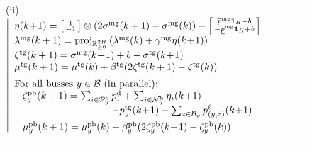 \documentclass{IEEEtran}  %
\newcommand{\mc}{\mathcal}
\newcommand{\bb}{\mathbb}
\newcommand{\R}{\bb R}
\newcommand{\proj}{\mathrm{proj}}
\newcommand{\0}{\mathbf{0}}
\newcommand{\1}{\mathbf{1}}
\begin{document}
\begin{figure}
{\begin{minipage}{\columnwidth}
\medskip
\noindent
\noindent 
(ii) \\[.2em]
\hspace*{.15em}
$
\left| 
\begin{array}{l}
%
\eta(k\!+\!1) = 
	\left[
	\begin{smallmatrix}
	1\\
	- 1 
	\end{smallmatrix}
	\right] \otimes (2 \sigma^{\text{mg}}(k+1)- \sigma^{\text{mg}}(k)) 
	-
	\left[
	\begin{smallmatrix}
	\overline{p}^{\mathrm{mg}}\1_{H}-b \\
	-     \underline{p}^{\mathrm{mg}} \1_{H}+b
	\end{smallmatrix} 
	\right]\\
	\lambda^{\text{mg}}(k+1) = \textstyle
	\proj_{\R^{2 H}_{\geq 0}}\left( 
	\lambda^{\text{mg}}(k) + \gamma^{\text{mg}} \eta(k\!+\!1)
	 \right)\\
%
\zeta^{\text{tg}}(k+1) = \sigma^{\text{mg}}
	(k\!+\!1)+b- \sigma^{\text{tg}}(k\!+\!1)\\
	\mu^{\text{tg}}(k+1) = \mu^{\text{tg}}(k) + \beta^{\text{tg}} (2\zeta^{\text{tg}}(k+1)-\zeta^{\text{tg}}(k))\\[.5em]
\text{For all busses } y \in \mc B \text{ (in parallel):}\\
\left|
\begin{array}{l}
\zeta^{\text{pb}}_y(k+1)   = \sum_{i \in \mc P_y^{\mathrm{b}}} p_i^{\mathrm{d}} + \sum_{i \in \mc N_y^{\mathrm{b}}} \eta_i(k\!+\!1)\\
\hspace*{9em} - p^{\text{tg}}_y(k\!+\!1) - \sum_{z \in \mc B_y} p^\ell_{(y,z)} (k\!+\!1)\\[.5em]
%
\mu_y^{\text{pb}}(k+1) = \mu_y^{\text{pb}}(k) + \beta^{\text{pb}}_y (2 \zeta^{\text{pb}}_y(k\!+\!1)- \zeta^{\text{pb}}_y(k))
\end{array}
\right.
\end{array}
\right.
$

\medskip
\hrule
\end{minipage}
}
\end{figure}
\end{document}
